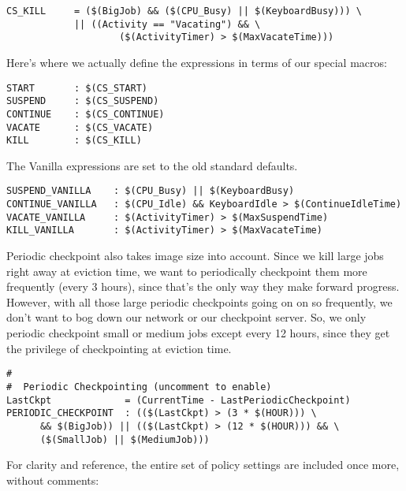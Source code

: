 \begin{verbatim}
CS_KILL     = ($(BigJob) && ($(CPU_Busy) || $(KeyboardBusy))) \
            || ((Activity == "Vacating") && \
                    ($(ActivityTimer) > $(MaxVacateTime))) 
\end{verbatim}

Here's where we actually define the expressions in terms of our
special macros:

\begin{verbatim}
START       : $(CS_START)
SUSPEND     : $(CS_SUSPEND)
CONTINUE    : $(CS_CONTINUE)
VACATE      : $(CS_VACATE)
KILL        : $(CS_KILL)
\end{verbatim}

The Vanilla expressions are set to the old standard defaults.

\begin{verbatim}
SUSPEND_VANILLA    : $(CPU_Busy) || $(KeyboardBusy)
CONTINUE_VANILLA   : $(CPU_Idle) && KeyboardIdle > $(ContinueIdleTime)
VACATE_VANILLA     : $(ActivityTimer) > $(MaxSuspendTime)
KILL_VANILLA       : $(ActivityTimer) > $(MaxVacateTime)
\end{verbatim}

Periodic checkpoint also takes image size into account.  Since we kill
large jobs right away at eviction time, we want to periodically
checkpoint them more frequently (every 3 hours), since that's the only
way they make forward progress.  However, with all those large
periodic checkpoints going on on so frequently, we don't want to bog
down our network or our checkpoint server.  So, we only periodic
checkpoint small or medium jobs except every 12 hours, since they get the
privilege of checkpointing at eviction time.

\begin{verbatim}
#
#  Periodic Checkpointing (uncomment to enable)
LastCkpt             = (CurrentTime - LastPeriodicCheckpoint)
PERIODIC_CHECKPOINT  : (($(LastCkpt) > (3 * $(HOUR))) \
      && $(BigJob)) || (($(LastCkpt) > (12 * $(HOUR))) && \
      ($(SmallJob) || $(MediumJob)))
\end{verbatim}

For clarity and reference, the entire set of policy settings are
included once more, without comments:

